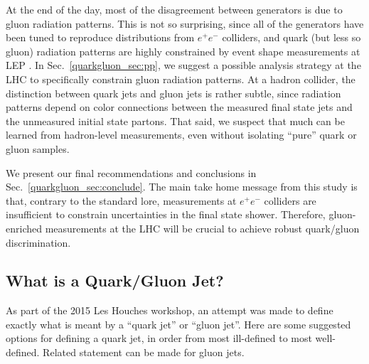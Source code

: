 \documentclass[11pt]{cernrep}
\begin{document}
At the end of the day, most of the disagreement between generators is due to gluon radiation patterns.  This is not so surprising, since all of the generators have been tuned to reproduce distributions from $e^+ e^-$ colliders, and quark (but less so gluon) radiation patterns are highly constrained by event shape measurements at LEP \cite{Heister:2003aj,Abdallah:2003xz,Achard:2004sv,Abbiendi:2004qz}.  In Sec.~\ref{quarkgluon_sec:pp}, we suggest a possible analysis strategy at the LHC to specifically constrain gluon radiation patterns.  At a hadron collider, the distinction between quark jets and gluon jets is rather subtle, since radiation patterns depend on color connections between the measured final state jets and the unmeasured initial state partons.  That said, we suspect that much can be learned from hadron-level measurements, even without isolating ``pure'' quark or gluon samples.

We present our final recommendations and conclusions in Sec.~\ref{quarkgluon_sec:conclude}.  The main take home message from this study is that, contrary to the standard lore, measurements at $e^+e^-$ colliders are insufficient to constrain uncertainties in the final state shower.   Therefore, gluon-enriched measurements at the LHC will be crucial to achieve robust quark/gluon discrimination.

\subsection{What is a Quark/Gluon Jet?}
\label{quarkgluon_sec:def}

As part of the 2015 Les Houches workshop, an attempt was made to define exactly what is meant by a ``quark jet'' or ``gluon jet''.  Here are some suggested options for defining a quark jet, in order from most ill-defined to most well-defined.  Related statement can be made for gluon jets.
\end{document}
